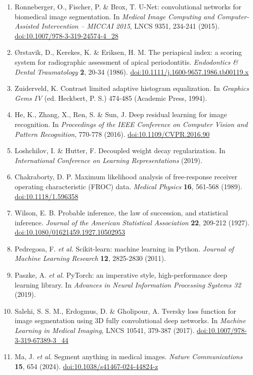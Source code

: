 \documentclass[twocolumn]{article}
\begin{document}
{\begin{enumerate}[leftmargin=5mm,itemsep=1mm]
\item Ronneberger, O., Fischer, P. \& Brox, T. U-Net: convolutional networks for biomedical image segmentation. In \textit{Medical Image Computing and Computer-Assisted Intervention -- MICCAI 2015}, LNCS 9351, 234-241 (2015). \href{https://doi.org/10.1007/978-3-319-24574-4_28}{doi:10.1007/978-3-319-24574-4\_28}
\item Ørstavik, D., Kerekes, K. \& Eriksen, H. M. The periapical index: a scoring system for radiographic assessment of apical periodontitis. \textit{Endodontics \& Dental Traumatology} \textbf{2}, 20-34 (1986). \href{https://doi.org/10.1111/j.1600-9657.1986.tb00119.x}{doi:10.1111/j.1600-9657.1986.tb00119.x}
\item Zuiderveld, K. Contrast limited adaptive histogram equalization. In \textit{Graphics Gems IV} (ed. Heckbert, P. S.) 474-485 (Academic Press, 1994).
\item He, K., Zhang, X., Ren, S. \& Sun, J. Deep residual learning for image recognition. In \textit{Proceedings of the IEEE Conference on Computer Vision and Pattern Recognition}, 770-778 (2016). \href{https://doi.org/10.1109/CVPR.2016.90}{doi:10.1109/CVPR.2016.90}
\item Loshchilov, I. \& Hutter, F. Decoupled weight decay regularization. In \textit{International Conference on Learning Representations} (2019).
\item Chakraborty, D. P. Maximum likelihood analysis of free-response receiver operating characteristic (FROC) data. \textit{Medical Physics} \textbf{16}, 561-568 (1989). \href{https://doi.org/10.1118/1.596358}{doi:10.1118/1.596358}
\item Wilson, E. B. Probable inference, the law of succession, and statistical inference. \textit{Journal of the American Statistical Association} \textbf{22}, 209-212 (1927). \href{https://doi.org/10.1080/01621459.1927.10502953}{doi:10.1080/01621459.1927.10502953}
\item Pedregosa, F. \textit{et al.} Scikit-learn: machine learning in Python. \textit{Journal of Machine Learning Research} \textbf{12}, 2825-2830 (2011).
\item Paszke, A. \textit{et al.} PyTorch: an imperative style, high-performance deep learning library. In \textit{Advances in Neural Information Processing Systems 32} (2019).
\item Salehi, S. S. M., Erdogmus, D. \& Gholipour, A. Tversky loss function for image segmentation using 3D fully convolutional deep networks. In \textit{Machine Learning in Medical Imaging}, LNCS 10541, 379-387 (2017). \href{https://doi.org/10.1007/978-3-319-67389-3_44}{doi:10.1007/978-3-319-67389-3\_44}
\item Ma, J. \textit{et al.} Segment anything in medical images. \textit{Nature Communications} \textbf{15}, 654 (2024). \href{https://doi.org/10.1038/s41467-024-44824-z}{doi:10.1038/s41467-024-44824-z}
\end{enumerate}}
\end{document}
